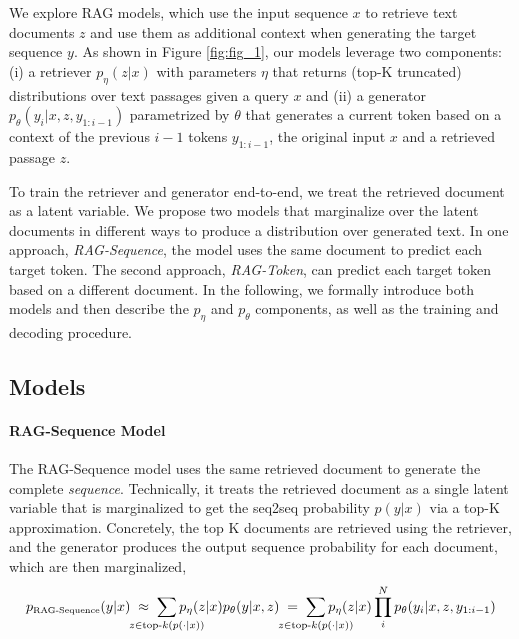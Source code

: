 \newcommand{\doc}{\ensuremath{z}}
\newcommand{\docs}{\ensuremath{\mathbf{z}}}
\newcommand{\answer}{\ensuremath{y}}
\newcommand{\genparam}{\ensuremath{\theta}}
\newcommand{\retparam}{\ensuremath{\eta}}
\newcommand{\query}{\ensuremath{x}}
\newcommand{\peranswer}{p_{\text{\tiny{RAG-Sequence}}}}
\newcommand{\pertoken}{p_{\text{\tiny{RAG-Token}}}}
\newcommand{\denc}{\mathbf{d}}
\newcommand{\qenc}{\mathbf{q}}
\newcommand{\topk}{\ensuremath{\text{top-k}(p_\eta(\cdot|\query))}}
\newcommand{\raganswer}{RAG-Sequence}
\newcommand{\ragtoken}{RAG-Token}
\newcommand{\history}[1]{{1:#1-1}}


We explore RAG models, which use the input sequence \query{} to retrieve text documents \doc{} and use them as additional context when generating the target sequence \answer{}. As shown in Figure \ref{fig:fig_1}, our models leverage two components: (i) a retriever $p_\retparam(\doc|\query)$ with parameters \retparam{} that returns (top-K truncated) distributions over text passages given a query \query{} and (ii) a generator $p_\genparam(y_i|\query, \doc, y_\history{i})$ parametrized by \genparam{} that generates a current token based on a context of the previous $i-1$ tokens $y_\history{i}$, the original input \query{} and a retrieved passage \doc{}.  

To train the retriever and generator end-to-end, we treat the retrieved document as a latent variable. 
We propose two models that marginalize over the latent documents in different ways to produce a distribution over generated text. In one approach, \emph{\raganswer{}}, the model uses the same document to predict each target token. The second approach, \emph{\ragtoken{}}, can predict each target token based on a different document. In the following, we formally introduce both models and then describe the $p_\retparam$ and $p_\genparam$ components, as well as the training and decoding procedure.

\subsection{Models}
\paragraph{\raganswer{} Model}
The \raganswer{} model uses the same retrieved document to generate the complete \emph{sequence}. Technically, it treats the retrieved document as a single latent variable that is marginalized to get the seq2seq probability $p(\answer|\query)$ via a top-K approximation. Concretely, the top K documents are retrieved using the retriever, and the generator produces the output sequence probability for each document, which are then marginalized, 
\[
\peranswer(\answer|\query)\; \approx \; \sum_{\mathclap{\doc \in \text{top-}k(p(\cdot|\query))}} p_\retparam(\doc|\query) p_\genparam(\answer | \query, \doc)\; = \; \sum_{\mathclap{\doc \in \text{top-}k(p(\cdot|\query))}} p_\retparam(\doc|\query)\prod_i^N p_\genparam(y_i|\query, \doc, y_\history{i}) 
\]

